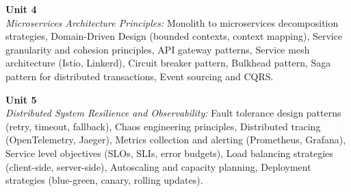\noindent\textbf{Unit 4} \\
\textit{Microservices Architecture Principles:} Monolith to microservices decomposition strategies, Domain-Driven Design (bounded contexts, context mapping), Service granularity and cohesion principles, API gateway patterns, Service mesh architecture (Istio, Linkerd), Circuit breaker pattern, Bulkhead pattern, Saga pattern for distributed transactions, Event sourcing and CQRS.

\vspace{0.3cm}

\noindent\textbf{Unit 5} \\
\textit{Distributed System Resilience and Observability:} Fault tolerance design patterns (retry, timeout, fallback), Chaos engineering principles, Distributed tracing (OpenTelemetry, Jaeger), Metrics collection and alerting (Prometheus, Grafana), Service level objectives (SLOs, SLIs, error budgets), Load balancing strategies (client-side, server-side), Autoscaling and capacity planning, Deployment strategies (blue-green, canary, rolling updates).

\newpage
{}
